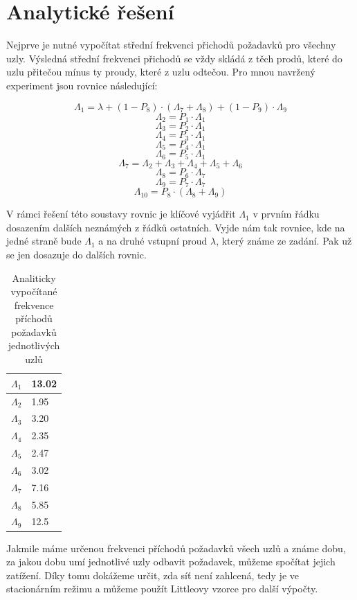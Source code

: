 \documentclass{article}
\begin{document}
\section{Analytické řešení}

Nejprve je nutné vypočítat střední frekvenci přichodů požadavků pro všechny uzly. 
Výsledná střední frekvenci přichodů se vždy skládá z těch prodů, které do uzlu přitečou mínus ty proudy, které z uzlu odtečou.
Pro mnou navržený experiment jsou rovnice následující:



$$
\Lambda_1 = \lambda + (1 - P_{8}) \cdot (\Lambda_{7} + \Lambda_{8}) + (1 - P_{9}) \cdot \Lambda_{9}
$$
$$
\Lambda_{2} = P_1 \cdot \Lambda_{1} 
$$
$$
\Lambda_{3} = P_2 \cdot \Lambda_{1} 
$$
$$
\Lambda_{4} = P_3 \cdot \Lambda_{1} 
$$
$$
\Lambda_{5} = P_4 \cdot \Lambda_{1} 
$$
$$
\Lambda_{6} = P_5 \cdot \Lambda_{1} 
$$
$$
\Lambda_{7} = \Lambda_{2} + \Lambda_{3} + \Lambda_{4}  + \Lambda_{5} + \Lambda_{6} 
$$
$$
\Lambda_{8} = P_6 \cdot \Lambda_{7} 
$$
$$
\Lambda_{9} = P_7 \cdot \Lambda_{7} 
$$
$$
\Lambda_{10} = P_8 \cdot (\Lambda_{8} + \Lambda_{9}) 
$$

V rámci řešení této soustavy rovnic je klíčové vyjádřit $\Lambda_1$ v prvním řádku dosazením dalších neznámých z řádků ostatních. 
Vyjde nám tak rovnice, kde na jedné straně bude $\Lambda_1$ a na druhé vstupní proud $\lambda$, který známe ze zadání.
Pak už se jen dosazuje do dalších rovnic.

\begin{table} [ht!]
\centering
    \begin{tabular}{|l|l|}
    \hline
   $\Lambda_1$     & 13.02 \\ \hline
    $\Lambda_2$  & 1.95 \\ \hline
    $\Lambda_3$     & 3.20 \\ \hline
    $\Lambda_4$     & 2.35 \\ \hline
    $\Lambda_5$     & 2.47 \\ \hline
    $\Lambda_6$      & 3.02 \\ \hline
    $\Lambda_7$      & 7.16 \\ \hline
    $\Lambda_8$      & 5.85 \\ \hline
    $\Lambda_9$      & 12.5 \\ \hline
    \end{tabular}
    \caption {Analiticky vypočítané frekvence příchodů požadavků jednotlivých uzlů}
\end{table}

Jakmile máme určenou frekvenci příchodů požadavků všech uzlů a známe dobu, za jakou dobu umí jednotlivé uzly odbavit požadavek, můžeme spočítat jejich zatížení.
Díky tomu dokážeme určit, zda síť není zahlcená, tedy je ve stacionárním režimu a můžeme použít Littleovy vzorce pro další výpočty.
\end{document}
